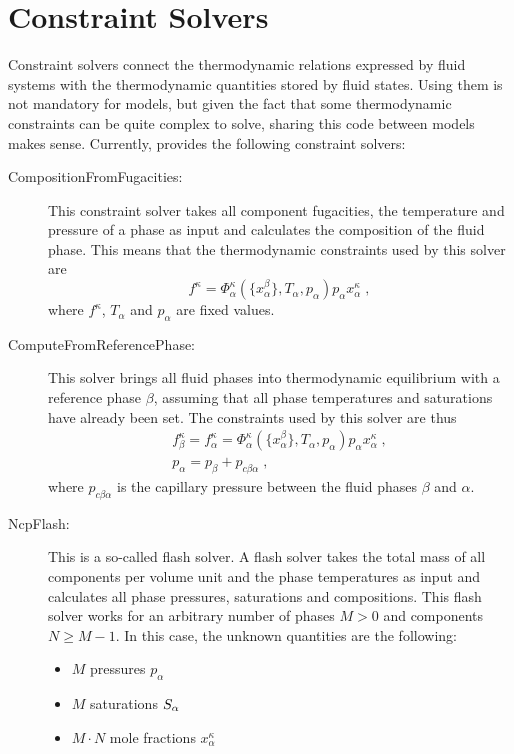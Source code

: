 \section{Constraint Solvers}
\label{sec:constraint_solvers}

Constraint solvers connect the thermodynamic relations expressed by
fluid systems with the thermodynamic quantities stored by fluid
states. Using them is not mandatory for models, but given the fact
that some thermodynamic constraints can be quite complex to solve,
sharing this code between models makes sense. Currently, \Dumux
provides the following constraint solvers:
\begin{description}
\item[CompositionFromFugacities:] This constraint solver takes all
  component fugacities, the temperature and pressure of a phase as
  input and calculates the composition of the fluid phase. This means
  that the thermodynamic constraints used by this solver are
  \[
  f^\kappa = \Phi^\kappa_\alpha(\{x^\beta_\alpha \}, T_\alpha, p_\alpha)  p_\alpha x^\kappa_\alpha\;,
  \]
  where ${f^\kappa}$, $T_\alpha$ and $p_\alpha$ are fixed values.
\item[ComputeFromReferencePhase:] This solver brings all
  fluid phases into thermodynamic equilibrium with a reference phase
  $\beta$, assuming that all phase temperatures and saturations have
  already been set. The constraints used by this solver are thus
  \begin{eqnarray*}
  f^\kappa_\beta = f^\kappa_\alpha = \Phi^\kappa_\alpha(\{x^\beta_\alpha \}, T_\alpha, p_\alpha)  p_\alpha x^\kappa_\alpha\;, \\
  p_\alpha = p_\beta + p_{c\beta\alpha} \;,
  \end{eqnarray*}
  where $p_{c\beta\alpha}$ is the capillary pressure between the
  fluid phases $\beta$ and $\alpha$.
\item[NcpFlash:] This is a so-called flash solver. A flash solver
  takes the total mass of all components per volume unit and the phase
  temperatures as input and calculates all phase pressures,
  saturations and compositions. This flash solver works for an
  arbitrary number of phases $M > 0$ and components $N \geq M - 1$. In
  this case, the unknown quantities are the following:
  \begin{itemize}
  \item $M$ pressures $p_\alpha$
  \item $M$ saturations $S_\alpha$
  \item $M\cdot N$ mole fractions $x^\kappa_\alpha$

\end{itemize}
\end{description}
